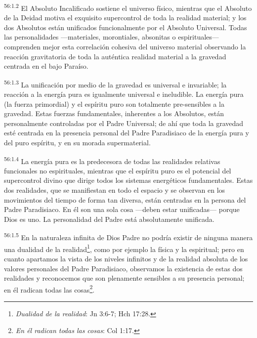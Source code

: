 \par
\textsuperscript{56:1.2} El Absoluto Incalificado sostiene el universo físico, mientras que el Absoluto de la Deidad motiva el exquisito supercontrol de toda la realidad material; y los dos Absolutos están unificados funcionalmente por el Absoluto Universal. Todas las personalidades ---materiales, morontiales, absonitas o espirituales--- comprenden mejor esta correlación cohesiva del universo material observando la reacción gravitatoria de toda la auténtica realidad material a la gravedad centrada en el bajo Paraíso.

\par
\textsuperscript{56:1.3} La unificación por medio de la gravedad es universal e invariable; la reacción a la energía pura es igualmente universal e ineludible. La energía pura (la fuerza primordial) y el espíritu puro son totalmente pre-sensibles a la gravedad. Estas fuerzas fundamentales, inherentes a los Absolutos, están personalmente controladas por el Padre Universal; de ahí que toda la gravedad esté centrada en la presencia personal del Padre Paradisiaco de la energía pura y del puro espíritu, y en su morada supermaterial.

\par
\textsuperscript{56:1.4} La energía pura es la predecesora de todas las realidades relativas funcionales no espirituales, mientras que el espíritu puro es el potencial del supercontrol divino que dirige todos los sistemas energéticos fundamentales. Estas dos realidades, que se manifiestan en todo el espacio y se observan en los movimientos del tiempo de forma tan diversa, están centradas en la persona del Padre Paradisiaco. En él son una sola cosa ---deben estar unificadas--- porque Dios es uno. La personalidad del Padre está absolutamente unificada.

\par
\textsuperscript{56:1.5} En la naturaleza infinita de Dios Padre no podría existir de ninguna manera una dualidad de la realidad\footnote{\textit{Dualidad de la realidad}: Jn 3:6-7; Hch 17:28.}, como por ejemplo la física y la espiritual; pero en cuanto apartamos la vista de los niveles infinitos y de la realidad absoluta de los valores personales del Padre Paradisiaco, observamos la existencia de estas dos realidades y reconocemos que son plenamente sensibles a su presencia personal; en él radican todas las cosas\footnote{\textit{En él radican todas las cosas}: Col 1:17.}.

